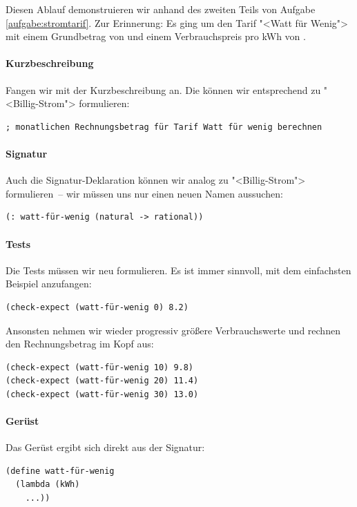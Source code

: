 Diesen Ablauf demonstruieren wir anhand des zweiten Teils von Aufgabe~
\ref{aufgabe:stromtarif}.  Zur Erinnerung:  Es ging um den Tarif
"<Watt für Wenig"> mit einem Grundbetrag von  und einem
Verbrauchspreis pro kWh von .

\paragraph{Kurzbeschreibung}

Fangen wir mit der Kurzbeschreibung an.  Die können wir entsprechend
zu "<Billig-Strom"> formulieren:
\begin{verbatim}
; monatlichen Rechnungsbetrag für Tarif Watt für wenig berechnen
\end{verbatim}

\paragraph{Signatur}

Auch die Signatur-Deklaration können wir analog zu "<Billig-Strom">
formulieren~-- wir müssen uns nur einen neuen Namen aussuchen:
%
\begin{verbatim}
(: watt-für-wenig (natural -> rational))
\end{verbatim}

\paragraph{Tests}

Die Tests müssen wir neu formulieren.  Es ist immer sinnvoll, mit dem
einfachsten Beispiel anzufangen:
\begin{verbatim}
(check-expect (watt-für-wenig 0) 8.2)
\end{verbatim}

Ansonsten nehmen wir wieder progressiv größere Verbrauchswerte und
rechnen den Rechnungsbetrag im Kopf aus:
%
\begin{verbatim}
(check-expect (watt-für-wenig 10) 9.8)
(check-expect (watt-für-wenig 20) 11.4)
(check-expect (watt-für-wenig 30) 13.0)
\end{verbatim}

\paragraph{Gerüst}

Das Gerüst ergibt sich direkt aus der Signatur:
%
\begin{verbatim}
(define watt-für-wenig
  (lambda (kWh)
    ...))
\end{verbatim}

